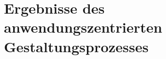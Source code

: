 
\section{Ergebnisse des anwendungszentrierten Gestaltungsprozesses}



\newpage



\newpage



\newpage

